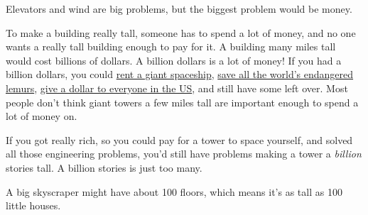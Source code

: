 {{Elevators and wind are big problems, but the biggest problem would be money.}

{To make a building really tall, someone has to spend a lot of money, and no one wants a really tall building enough to pay for it. A building many miles tall would cost billions of dollars. A billion dollars is a lot of money! If you had a billion dollars, you could \href{http://www.spacex.com/about/capabilities}{rent a giant spaceship}, \href{http://birdandmoon.tumblr.com/post/78504716512/this-weekend-i-found-myself-chatting-with-a-lemur}{save all the world's endangered lemurs}, \href{http://xkcd.com/980/huge/\#x=-7462&y=-6705&z=6} {give a dollar to everyone in the US}, and still have some left over. Most people don't think giant towers a few miles tall are important enough to spend a lot of money on.}

{If you got really rich, so you could pay for a tower to space yourself, and solved all those engineering problems, you'd still have problems making a tower a \emph{billion} stories tall. A billion stories is just too many.}

{A big skyscraper might have about 100 floors, which means it's as tall as 100 little houses.}

}
